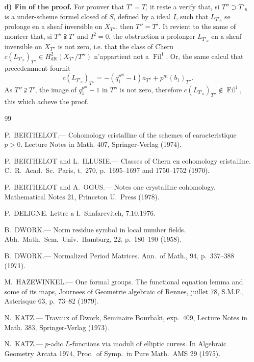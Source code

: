 \documentclass[12pt,a4paper]{article}
\theoremstyle{plain}
\theoremstyle{definition}
\theoremstyle{remark}
\DeclareMathOperator{\Fil}{Fil}
\begin{document}
\textbf{d) Fin of the proof.} For prouver that $T' = T$, it reste a verify that, si $T'' \supset T'_n$ is a under-scheme formel closed of $S$, defined by a ideal $I$, such that $L_{T'_n}$ se prolonge en a sheaf inversible on $X_{T''}$, then $T'' = T'$. It revient to the same of montrer that, si $T'' \supsetneqq T'$ and $I^2 = 0$, the obstruction a prolonger $L_{T'_n}$ en a sheaf inversible on $X_{T''}$ is not zero, i.e. that the class of Chern $c(L_{T'_n})_{T''} \in H^2_\mathrm{dR}(X_{T''}/T'')$ n'appartient not a $\Fil^1$. Or, the same calcul that precedemment fournit
\[
c(L_{T'_n})_{T''} = -(q_1^{p^m} - 1)a_{T''} + p^m (b_1)_{T''}.
\]
As $T'' \supsetneqq T'$, the image of $q_1^{p^m} - 1$ in $T''$ is not zero, therefore $c(L_{T'_n})_{T''} \notin \Fil^1$, this which acheve the proof.

\begin{thebibliography}{99}

P.~BERTHELOT.--- Cohomology cristalline of the schemes of caracteristique $p > 0$. Lecture Notes in Math. 407, Springer-Verlag (1974).

P.~BERTHELOT and L.~ILLUSIE.--- Classes of Chern en cohomology cristalline. C.\ R.\ Acad.\ Sc.\ Paris, t.\ 270, p.\ 1695--1697 and 1750--1752 (1970).

P.~BERTHELOT and A.~OGUS.--- Notes one crystalline cohomology. Mathematical Notes 21, Princeton U.\ Press (1978).

P.~DELIGNE. Lettre a I.\ Shafarevitch, 7.10.1976.

B.~DWORK.--- Norm residue symbol in local number fields. Abh.\ Math.\ Sem.\ Univ.\ Hamburg, 22, p.\ 180--190 (1958).

B.~DWORK.--- Normalized Period Matrices. Ann.\ of Math., 94, p.\ 337--388 (1971).

M.\ HAZEWINKEL.--- One formal groups. The functional equation lemma and some of its maps, Journees of Geometrie algebraic of Rennes, juillet 78, S.M.F., Asterisque 63, p.\ 73--82 (1979).

N.\ KATZ.--- Travaux of Dwork, Seminaire Bourbaki, exp.\ 409, Lecture Notes in Math. 383, Springer-Verlag (1973).

N.\ KATZ.--- $p$-adic $L$-functions via moduli of elliptic curves. In Algebraic Geometry Arcata 1974, Proc.\ of Symp.\ in Pure Math.\ AMS 29 (1975).


\end{thebibliography}
\end{document}
